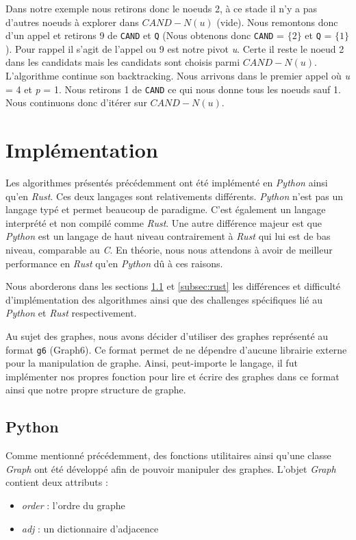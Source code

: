 \documentclass[12pt,a4paper]{article}
\begin{document}
Dans notre exemple nous retirons donc le noeuds 2, à ce stade il n'y a pas d'autres noeuds à explorer dans \(CAND - N(u)\) (vide). Nous remontons donc d'un appel et retirons 9 de \texttt{CAND} et \texttt{Q} (Nous obtenons donc \texttt{CAND} = \(\{2\}\) et \texttt{Q} = \(\{1\}\)). Pour rappel il s'agit de l'appel ou 9 est notre pivot \emph{u}. Certe il reste le noeud 2 dans les candidats mais les candidats sont choisis parmi \(CAND - N(u)\).
L'algorithme continue son backtracking. Nous arrivons dans le premier appel où \emph{u} = 4 et \emph{p} = 1. Nous retirons 1 de \texttt{CAND} ce qui nous donne tous les noeuds sauf 1. Nous continuons donc d'itérer sur \(CAND - N(u)\).




\section{Implémentation}%
\label{sec:impl}

Les algorithmes présentés précédemment ont été implémenté en \textit{Python} ainsi qu'en \textit{Rust}. Ces deux langages sont relativements différents. \textit{Python} n'est pas un langage typé et permet beaucoup de paradigme. C'est également un langage interprété et non compilé comme \emph{Rust}. Une autre différence majeur est que \emph{Python} est un langage de haut niveau contrairement à \emph{Rust} qui lui est de bas niveau, comparable au \emph{C}. En théorie, nous nous attendons à avoir de meilleur performance en \emph{Rust} qu'en \emph{Python} dû à ces raisons.

Nous aborderons dans les sections \ref{subsec:python} et \ref{subsec:rust} les différences et difficulté d'implémentation des algorithmes ainsi que des challenges spécifiques lié au \emph{Python} et \emph{Rust} respectivement.

Au sujet des graphes, nous avons décider d'utiliser des graphes représenté au format \texttt{g6} (Graph6\cite{g6}). Ce format permet de ne dépendre d'aucune librairie externe pour la manipulation de graphe. Ainsi, peut-importe le langage, il fut implémenter nos propres fonction pour lire et écrire des graphes dans ce format ainsi que notre propre structure de graphe.

\subsection{Python}%
\label{subsec:python}

Comme mentionné précédemment, des fonctions utilitaires ainsi qu'une classe \emph{Graph} ont été développé afin de pouvoir manipuler des graphes. L'objet \emph{Graph} contient deux attributs :
\begin{itemize}
  \item \emph{order} : l'ordre du graphe
  \item \emph{adj} : un dictionnaire d'adjacence
\end{itemize}
\end{document}
